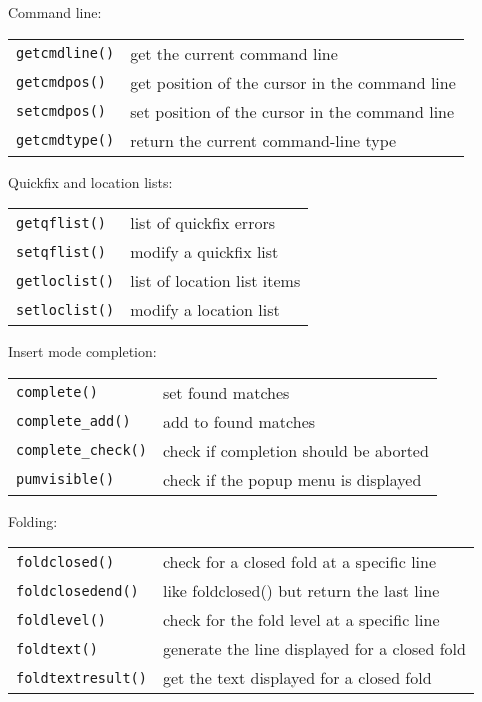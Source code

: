 Command line:
\label{command-line-functions}
\begin{center} \begin{tabular}{l l}
				\verb!getcmdline()! & get the current command line \\
				\verb!getcmdpos()! & get position of the cursor in the command line \\
				\verb!setcmdpos()! & set position of the cursor in the command line \\
				\verb!getcmdtype()! & return the current command-line type \\
\end{tabular} \end{center}

Quickfix and location lists:
\label{quickfix-functions}
\begin{center} \begin{tabular}{l l}
				\verb!getqflist()! & list of quickfix errors \\
				\verb!setqflist()! & modify a quickfix list \\
				\verb!getloclist()! & list of location list items \\
				\verb!setloclist()! & modify a location list \\
\end{tabular} \end{center}

Insert mode completion:
\label{completion-functions}
\begin{center} \begin{tabular}{l l}
				\verb!complete()! & set found matches \\
				\verb!complete_add()! & add to found matches \\
				\verb!complete_check()! & check if completion should be aborted \\
				\verb!pumvisible()! & check if the popup menu is displayed \\
\end{tabular} \end{center}

Folding:
\label{folding-functions}
\begin{center} \begin{tabular}{l l}
				\verb!foldclosed()! & check for a closed fold at a specific line \\
				\verb!foldclosedend()! & like foldclosed() but return the last line \\
				\verb!foldlevel()! & check for the fold level at a specific line \\
				\verb!foldtext()! & generate the line displayed for a closed fold \\
				\verb!foldtextresult()! & get the text displayed for a closed fold \\
\end{tabular} \end{center}

